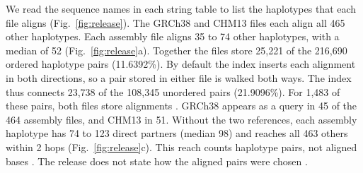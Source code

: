 We read the sequence names in each string table to list the haplotypes that each file aligns (Fig.~\ref{fig:release}).
The GRCh38 and CHM13 files each align all 465 other haplotypes.
Each assembly file aligns 35 to 74 other haplotypes, with a median of 52 (Fig.~\ref{fig:release}a).
Together the files store 25,221 of the 216,690 ordered haplotype pairs (11.6392\%).
By default the index inserts each alignment in both directions, so a pair stored in either file is walked both ways.
The index thus connects 23,738 of the 108,345 unordered pairs (21.9096\%).
For 1,483 of these pairs, both files store alignments .
GRCh38 appears as a query in 45 of the 464 assembly files, and CHM13 in 51.
Without the two references, each assembly haplotype has 74 to 123 direct partners (median 98) and reaches all 463 others within 2 hops (Fig.~\ref{fig:release}c).
This reach counts haplotype pairs, not aligned bases .
The release does not state how the aligned pairs were chosen .


